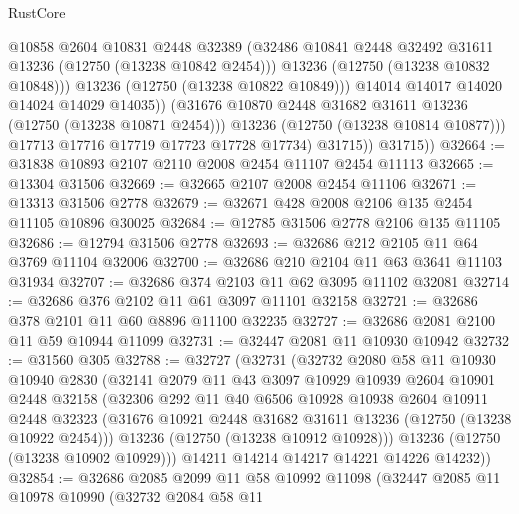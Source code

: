 \begin{lexlean}{RustCore}
\begin{coremodule}
                        @10858
                        @2604
                        @10831
                        @2448
                        @32389
                        (@32486 @10841 @2448 @32492 @31611 @13236 (@12750 (@13238 @10842 @2454)))
                        @13236
                        (@12750 (@13238 @10832 @10848)))
                      @13236
                      (@12750 (@13238 @10822 @10849)))
                    @14014
                    @14017
                    @14020
                    @14024
                    @14029
                    @14035))
                (@31676 @10870 @2448 @31682 @31611 @13236 (@12750 (@13238 @10871 @2454)))
                @13236
                (@12750 (@13238 @10814 @10877)))
              @17713
              @17716
              @17719
              @17723
              @17728
              @17734)
            @31715))
        @31715))
@32664 := @31838 @10893 @2107 @2110 @2008 @2454 @11107 @2454 @11113
@32665 := @13304 @31506
@32669 := @32665 @2107 @2008 @2454 @11106
@32671 := @13313 @31506 @2778
@32679 := @32671 @428 @2008 @2106 @135 @2454 @11105 @10896 @30025
@32684 := @12785 @31506 @2778 @2106 @135 @11105
@32686 := @12794 @31506 @2778
@32693 := @32686 @212 @2105 @11 @64 @3769 @11104 @32006
@32700 := @32686 @210 @2104 @11 @63 @3641 @11103 @31934
@32707 := @32686 @374 @2103 @11 @62 @3095 @11102 @32081
@32714 := @32686 @376 @2102 @11 @61 @3097 @11101 @32158
@32721 := @32686 @378 @2101 @11 @60 @8896 @11100 @32235
@32727 := @32686 @2081 @2100 @11 @59 @10944 @11099
@32731 := @32447 @2081 @11 @10930 @10942
@32732 := @31560 @305
@32788 := @32727
    (@32731
      (@32732
        @2080
        @58
        @11
        @10930
        @10940
        @2830
        (@32141
          @2079
          @11
          @43
          @3097
          @10929
          @10939
          @2604
          @10901
          @2448
          @32158
          (@32306
            @292
            @11
            @40
            @6506
            @10928
            @10938
            @2604
            @10911
            @2448
            @32323
            (@31676 @10921 @2448 @31682 @31611 @13236 (@12750 (@13238 @10922 @2454)))
            @13236
            (@12750 (@13238 @10912 @10928)))
          @13236
          (@12750 (@13238 @10902 @10929)))
        @14211
        @14214
        @14217
        @14221
        @14226
        @14232))
@32854 := @32686
    @2085
    @2099
    @11
    @58
    @10992
    @11098
    (@32447
      @2085
      @11
      @10978
      @10990
      (@32732
        @2084
        @58
        @11

\end{coremodule}
\end{lexlean}
